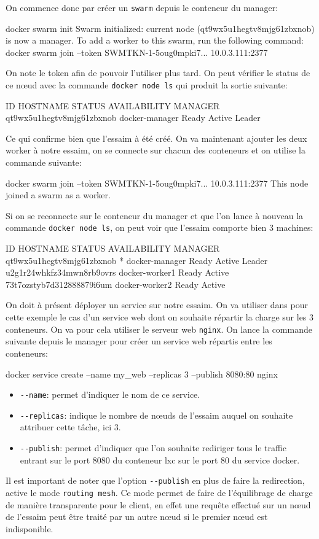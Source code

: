 On commence donc par créer un \verb:swarm: depuis le conteneur du manager:
\begin{bash}
docker swarm init
Swarm initialized: current node (qt9wx5u1hegtv8mjg61zbxnob) is now a manager.
To add a worker to this swarm, run the following command:
    docker swarm join --token SWMTKN-1-5oug0mpki7... 10.0.3.111:2377
\end{bash}
On note le token afin de pouvoir l'utiliser plus tard. On peut vérifier le status de 
ce nœud avec la commande \verb:docker node ls: qui produit la sortie suivante:
\begin{bash}
ID                        HOSTNAME         STATUS    AVAILABILITY   MANAGER
qt9wx5u1hegtv8mjg61zbxnob docker-manager   Ready     Active         Leader
\end{bash}
Ce qui confirme bien que l'essaim à été créé. On va maintenant ajouter les deux worker à notre 
essaim, on se connecte sur chacun des conteneurs et on utilise la commande suivante:
\begin{bash}
docker swarm join --token SWMTKN-1-5oug0mpki7... 10.0.3.111:2377
This node joined a swarm as a worker.
\end{bash}
Si on se reconnecte sur le conteneur du manager et que l'on lance à nouveau la commande
\verb:docker node ls:, on peut voir que l'essaim comporte bien 3 machines:
\begin{bash}
ID                          HOSTNAME         STATUS    AVAILABILITY   MANAGER
qt9wx5u1hegtv8mjg61zbxnob * docker-manager   Ready     Active         Leader 
u2g1r24whkfz34mwn8rb9ovrs   docker-worker1   Ready     Active                
73t7ozstyb7d312888879i6um   docker-worker2   Ready     Active                
\end{bash}
On doit à présent déployer un service sur notre essaim. On va utiliser dans pour cette exemple
le cas d'un service web dont on souhaite répartir la charge sur les 3 conteneurs. On va pour cela
utiliser le serveur web \verb:nginx:. On lance la commande suivante depuis le manager 
pour créer un service web répartis entre les conteneurs:
\begin{bash}
docker service create --name my_web --replicas 3 --publish 8080:80 nginx
\end{bash}
\begin{itemize}
    \item \verb:--name:: permet d'indiquer le nom de ce service.
    \item \verb:--replicas:: indique le nombre de nœuds de l'essaim auquel on souhaite
        attribuer cette tâche, ici 3.
    \item \verb:--publish:: permet d'indiquer que l'on souhaite rediriger tous le traffic 
        entrant sur le port 8080 du conteneur lxc sur le port 80 du service docker.  
\end{itemize}
Il est important de noter que l'option \verb:--publish: en plus de faire la redirection,
active le mode \verb:routing mesh:. Ce mode permet de faire de l'équilibrage de charge de
manière transparente pour le client, en effet une requête effectué sur un nœud de l'essaim 
peut être traité par un autre nœud si le premier nœud est indisponible.\newline 

